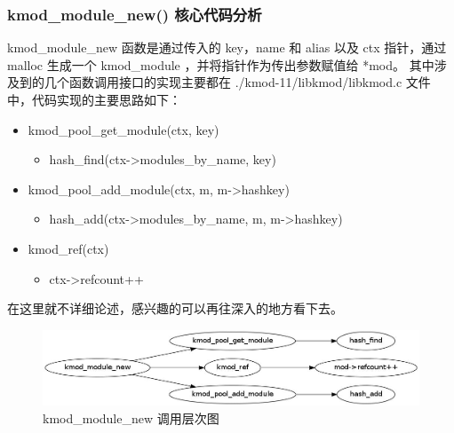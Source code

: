 \documentclass[11pt,a4paper]{article}
\makeatletter
\def\maxwidth{\ifdim\Gin@nat@width>\linewidth\linewidth
\else\Gin@nat@width\fi}
\let\Oldincludegraphics\includegraphics
\renewcommand{\includegraphics}[1]{\Oldincludegraphics[width=\maxwidth]{#1}}
\makeatother
\begin{document}
\subsubsection{kmod\_module\_new() 核心代码分析}

kmod\_module\_new 函数是通过传入的 key，name 和 alias 以及 ctx 指针，通过
malloc 生成一个 kmod\_module ，并将指针作为传出参数赋值给 *mod。
其中涉及到的几个函数调用接口的实现主要都在 ./kmod-11/libkmod/libkmod.c
文件中，代码实现的主要思路如下：

\begin{itemize}
\item
  kmod\_pool\_get\_module(ctx, key)
  \begin{itemize}
  \item
    hash\_find(ctx-\textgreater{}modules\_by\_name, key)
  \end{itemize}
\item
  kmod\_pool\_add\_module(ctx, m, m-\textgreater{}hashkey)
  \begin{itemize}
  \item
    hash\_add(ctx-\textgreater{}modules\_by\_name, m,
    m-\textgreater{}hashkey)
  \end{itemize}
\item
  kmod\_ref(ctx)
  \begin{itemize}
  \item
    ctx-\textgreater{}refcount++
  \end{itemize}
\end{itemize}
在这里就不详细论述，感兴趣的可以再往深入的地方看下去。

\begin{figure}[htbp]
\centering
\includegraphics{./figures/kmod_module_new.jpg}
\caption{kmod\_module\_new 调用层次图}
\end{figure}
\end{document}
